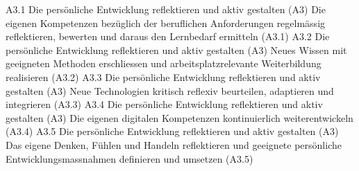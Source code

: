 \templateCard
  {A3.1}
  {Die persönliche Entwicklung reflektieren und aktiv gestalten (A3)}
  {Die eigenen Kompetenzen bezüglich der beruflichen Anforderungen regelmässig reflektieren, bewerten und daraus den Lernbedarf ermitteln (A3.1)}
\templateCard
  {A3.2}
  {Die persönliche Entwicklung reflektieren und aktiv gestalten (A3)}
  {Neues Wissen mit geeigneten Methoden erschliessen und arbeitsplatzrelevante Weiterbildung realisieren (A3.2)}
\templateCard
  {A3.3}
  {Die persönliche Entwicklung reflektieren und aktiv gestalten (A3)}
  {Neue Technologien kritisch reflexiv beurteilen, adaptieren und integrieren (A3.3)}
\templateCard
  {A3.4}
  {Die persönliche Entwicklung reflektieren und aktiv gestalten (A3)}
  {Die eigenen digitalen Kompetenzen kontinuierlich weiterentwickeln (A3.4)}
\templateCard
  {A3.5}
  {Die persönliche Entwicklung reflektieren und aktiv gestalten (A3)}
  {Das eigene Denken, Fühlen und Handeln reflektieren und geeignete persönliche Entwicklungsmassnahmen definieren und umsetzen (A3.5)}
